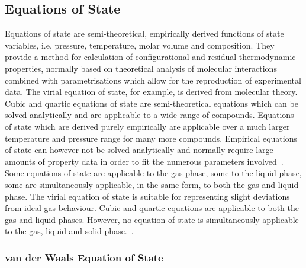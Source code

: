 \subsection{Equations of State}\label{EOSSection}

Equations of state are semi-theoretical, empirically derived functions of state variables, i.e. pressure, temperature, molar volume and composition. They provide a method for calculation of configurational and residual thermodynamic properties, normally based on theoretical analysis of molecular interactions combined with parametrisations which allow for the reproduction of experimental data. The virial equation of state, for example, is derived from molecular theory. Cubic and quartic equations of state are semi-theoretical equations which can be solved analytically and are applicable to a wide range of compounds. Equations of state which are derived purely empirically are applicable over a much larger temperature and pressure range for many more compounds. Empirical equations of state can however not be solved analytically and normally require large amounts of property data in order to fit the numerous parameters involved~\cite{ThermophysicalProperties, GasLiquidProperties}.\\

Some equations of state are applicable to the gas phase, some to the liquid phase, some are simultaneously applicable, in the same form, to both the gas and liquid phase.  The virial equation of state is suitable for representing slight deviations from ideal gas behaviour. Cubic and quartic equations are applicable to both the gas and liquid phases. However, no equation of state is simultaneously applicable to the gas, liquid and solid phase.~\cite{ThermophysicalProperties, GasLiquidProperties}.\



\subsubsection{van der Waals Equation of State}\label{vanderWaalsEOSSection}\

